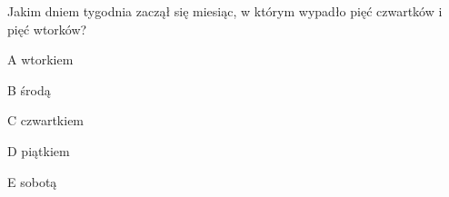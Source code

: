 \begin{tresc}
Jakim dniem tygodnia zaczął się miesiąc, w którym wypadło pięć czwartków i pięć wtorków?
\end{tresc}
\begin{wariant}{A} wtorkiem \end{wariant}
\begin{wariant}{B} środą \end{wariant}
\begin{wariant}{C} czwartkiem \end{wariant}
\begin{wariant}{D} piątkiem \end{wariant}
\begin{wariant}{E} sobotą \end{wariant}
